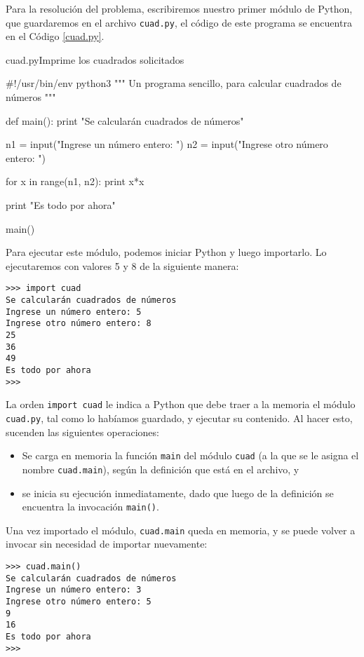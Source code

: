 \begin{solucion}
Para la resolución del problema, escribiremos nuestro primer módulo de
Python, que guardaremos en el archivo \verb!cuad.py!, el código de este
programa se encuentra en el Código \ref{cuad.py}.

\begin{codigo}{cuad.py}{Imprime los cuadrados solicitados}
\label{cuad.py}
\begin{codigo-python}
#!/usr/bin/env python3
""" Un programa sencillo, para calcular cuadrados
de números """

def main():
    print "Se calcularán cuadrados de números"

    n1 = input("Ingrese un número entero: ")
    n2 = input("Ingrese otro número entero: ")

    for x in range(n1, n2):
        print x*x

    print "Es todo por ahora"

main()
\end{codigo-python}
\end{codigo}

Para ejecutar este módulo, podemos iniciar Python y luego
importarlo. Lo ejecutaremos con valores 5 y 8 de la siguiente
manera:
\begin{lstlisting}[numbers=none]
>>> import cuad
Se calcularán cuadrados de números
Ingrese un número entero: 5
Ingrese otro número entero: 8
25
36
49
Es todo por ahora
>>>
\end{lstlisting}

La orden \lstinline+import cuad+ le indica a Python que debe traer a la
memoria el módulo \verb+cuad.py+, tal como lo habíamos guardado, y
ejecutar su contenido. Al hacer esto, sucenden las siguientes operaciones:

\begin{itemize}
\item Se carga en memoria la función \lstinline+main+ del módulo
\lstinline+cuad+ (a la que se le asigna el nombre \lstinline+cuad.main+),
según la definición que está en el archivo, y

\item se inicia su ejecución inmediatamente, dado que luego de la
definición se encuentra la invocación \lstinline+main()+.
\end{itemize}

Una vez importado el módulo, \lstinline+cuad.main+ queda en memoria, y
se puede volver a invocar sin necesidad de importar nuevamente:

\begin{lstlisting}[numbers=none]
>>> cuad.main()
Se calcularán cuadrados de números
Ingrese un número entero: 3
Ingrese otro número entero: 5
9
16
Es todo por ahora
>>>
\end{lstlisting}
\end{solucion}

